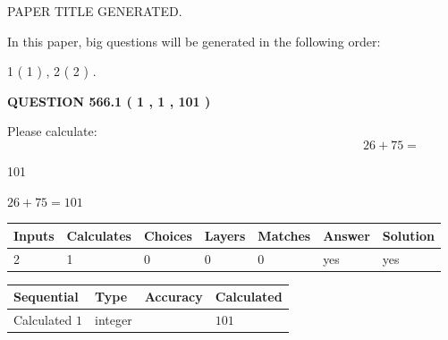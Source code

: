 \documentclass[12pt]{article}
\begin{document}
   
 PAPER TITLE GENERATED.
   
   
   
\vspace{0.2in}
   
In this paper, big questions will be generated in the following order: 
   
   
   1 ( 1 )
 ,
   2 ( 2 )
 .
  
\vspace{0.2in}
  
{\textbf{\Large{QUESTION
566.1 
 ( 1 , 1 , 101 )
}}}
  
  
 
Please calculate:
\begin{equation}
26 +  %
75 = \nonumber
\end{equation}
 
 
 
\noindent{}
 
 

101
 
 
\noindent{}
 
 

 
 
 
\noindent{}
 
 

$ %
26 +  %
75=   %
101$
 
 
\noindent{}
 
 

 
   
   
   
   
\noindent\begin{tabular}{|l|l|l|l|l|l|l|}
 \hline
Inputs & Calculates & Choices & Layers & Matches & Answer & Solution \\ \hline
 2  & 
 1  & 
 0
  & 
 0  & 
 0  & 
  yes & 
  yes 
  \\ \hline
 \end{tabular}
   
   
   
   
\noindent{}
   
   
  
  
\noindent\begin{tabular}{|l|l|l|l|}
\hline
 Sequential & Type & Accuracy & Calculated \\ 
\hline
 
 
  Calculated $  1 $ & integer &  & 
  $ 101 $ 
 \\  \hline  
 \end{tabular}
   
\end{document}
